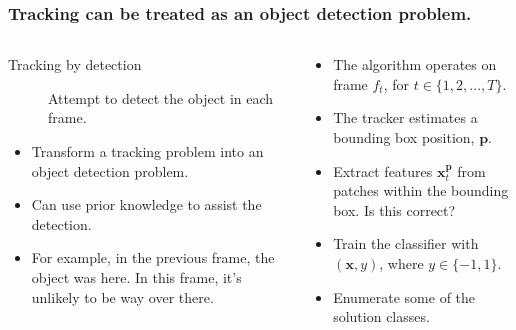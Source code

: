 \begin{frame}
    \frametitle{Tracking can be treated as an object detection problem. \cite{6671560}}
    \begin{columns}[T]
        \begin{column}{0.5\textwidth}
            \begin{description}
                \item [Tracking by detection] Attempt to detect the object in each frame.
            \end{description}
            \begin{itemize}
                \item Transform a tracking problem into an object detection problem.
                \item Can use prior knowledge to assist the detection.
                \item For example, in the previous frame, the object was here. In this frame, it's
                    unlikely to be way over there.
            \end{itemize}
        \end{column}
        \begin{column}{0.5\textwidth}
            \begin{itemize}
                \item The algorithm operates on frame \(f_t\), for \(t \in \{1, 2, ..., T\}\).
                \item The tracker estimates a bounding box position, \(\mathbf{p}\).
                \item Extract features \(\mathbf{x}_t^\mathbf{p}\) from patches within the bounding
                    box. \alert{Is this correct?}
                \item Train the classifier with \((\mathbf{x}, y)\), where \(y \in \{-1, 1\}\).
                \item \alert{Enumerate some of the solution classes.}
            \end{itemize}
        \end{column}
    \end{columns}
\end{frame}
